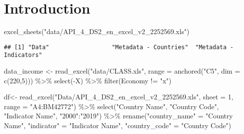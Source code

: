 \documentclass[11pt,a4paper,]{article}
\author{\sf\Large\textbf{ Mengyuan YANG}\\ {\sf\large Master of Business Analytics\\[0.5cm]} \sf\Large\textbf{ Zoljargal BATSAIKHAN}\\ {\sf\large Master of Business Analytics\\[0.5cm]} \sf\Large\textbf{ Xinrui WANG}\\ {\sf\large Master of Business Analytics\\[0.5cm]} \sf\Large\textbf{ Xueqi GOH}\\ {\sf\large Master of Business Analytics\\[0.5cm]}}
\date{\sf\Date~\Month~\Year}
\newenvironment{Shaded}{\begin{snugshade}}{\end{snugshade}}
\newcommand{\AttributeTok}[1]{\textcolor[rgb]{0.77,0.63,0.00}{#1}}
\newcommand{\DecValTok}[1]{\textcolor[rgb]{0.00,0.00,0.81}{#1}}
\newcommand{\FunctionTok}[1]{\textcolor[rgb]{0.00,0.00,0.00}{#1}}
\newcommand{\NormalTok}[1]{#1}
\newcommand{\OtherTok}[1]{\textcolor[rgb]{0.56,0.35,0.01}{#1}}
\newcommand{\SpecialCharTok}[1]{\textcolor[rgb]{0.00,0.00,0.00}{#1}}
\newcommand{\StringTok}[1]{\textcolor[rgb]{0.31,0.60,0.02}{#1}}
\begin{document}
{
\setcounter{tocdepth}{2}
\tableofcontents
}
\section*{Introduction}

\begin{Shaded}
\begin{Highlighting}[]
\FunctionTok{excel\_sheets}\NormalTok{(}\StringTok{"data/API\_4\_DS2\_en\_excel\_v2\_2252569.xls"}\NormalTok{)}
\end{Highlighting}
\end{Shaded}

\begin{verbatim}
## [1] "Data"                  "Metadata - Countries"  "Metadata - Indicators"
\end{verbatim}

\begin{Shaded}
\begin{Highlighting}[]
\NormalTok{data\_income }\OtherTok{\textless{}{-}} \FunctionTok{read\_excel}\NormalTok{(}\StringTok{"data/CLASS.xls"}\NormalTok{, }\AttributeTok{range =} \FunctionTok{anchored}\NormalTok{(}\StringTok{"C5"}\NormalTok{, }\AttributeTok{dim =} \FunctionTok{c}\NormalTok{(}\DecValTok{220}\NormalTok{,}\DecValTok{5}\NormalTok{))) }\SpecialCharTok{\%\textgreater{}\%} 
  \FunctionTok{select}\NormalTok{(}\SpecialCharTok{{-}}\NormalTok{X) }\SpecialCharTok{\%\textgreater{}\%} 
  \FunctionTok{filter}\NormalTok{(Economy }\SpecialCharTok{!=} \StringTok{"x"}\NormalTok{)}
\end{Highlighting}
\end{Shaded}

\begin{Shaded}
\begin{Highlighting}[]
\NormalTok{df}\OtherTok{\textless{}{-}} \FunctionTok{read\_excel}\NormalTok{(}\StringTok{"Data/API\_4\_DS2\_en\_excel\_v2\_2252569.xls"}\NormalTok{, }\AttributeTok{sheet =} \DecValTok{1}\NormalTok{, }\AttributeTok{range =} \StringTok{"A4:BM42772"}\NormalTok{) }\SpecialCharTok{\%\textgreater{}\%} 
  \FunctionTok{select}\NormalTok{(}\StringTok{"Country Name"}\NormalTok{, }
         \StringTok{"Country Code"}\NormalTok{,}
         \StringTok{"Indicator Name"}\NormalTok{, }
         \StringTok{"2000"}\SpecialCharTok{:}\StringTok{"2019"}\NormalTok{) }\SpecialCharTok{\%\textgreater{}\%} 
  \FunctionTok{rename}\NormalTok{(}\StringTok{"country\_name"} \OtherTok{=} \StringTok{"Country Name"}\NormalTok{,}
         \StringTok{"indicator"} \OtherTok{=} \StringTok{"Indicator Name"}\NormalTok{,}
         \StringTok{"country\_code"} \OtherTok{=} \StringTok{"Country Code"}\NormalTok{)}
\end{Highlighting}
\end{Shaded}
\end{document}
